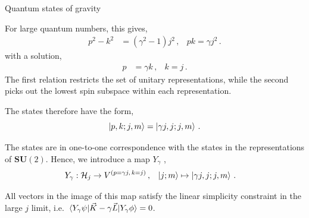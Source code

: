 \documentclass{beamer}
\begin{document}
\begin{frame}{Quantum states of gravity}
    \begin{list}{\maltese}{\leftmargin=1em \itemindent=0em}
        \item<1-> For large quantum numbers, this gives,
        \begin{align}
            p^2-k^2 &=(\gamma^2-1)j^2\,, &pk=\gamma j^2\,.
        \end{align}
        with a solution,
        \begin{align}
            p &=\gamma k\,, & k=j\,.
        \end{align}
        The first relation restricts the set of unitary representations, while the second picks out the lowest spin subspace within each representation.
        \item<2-> The states therefore have the form,
        \begin{equation}
            \ket{p,k;j,m}=\ket{\gamma j,j;j,m}\,.
        \end{equation}
        \item<3-> The states are in one-to-one correspondence with the states in the representations of $\mathbf{SU}(2)$. Hence, we introduce a map $Y_\gamma$ ,
        \begin{align}
            Y_\gamma:\mathcal{H}_j &\to V^{(p=\gamma j,\,k=j)}\,,
            &\ket{j;m}&\mapsto \ket{\gamma j,j;j,m}\,.
        \end{align}
        \item<4-> All vectors in the image of this map satisfy the linear simplicity constraint in the large $j$ limit, i.e. $\mel{Y_\gamma \psi}{\vec{K}-\gamma\vec{L}}{Y_\gamma \phi}=0$.
    \end{list}
\end{frame}
\end{document}
